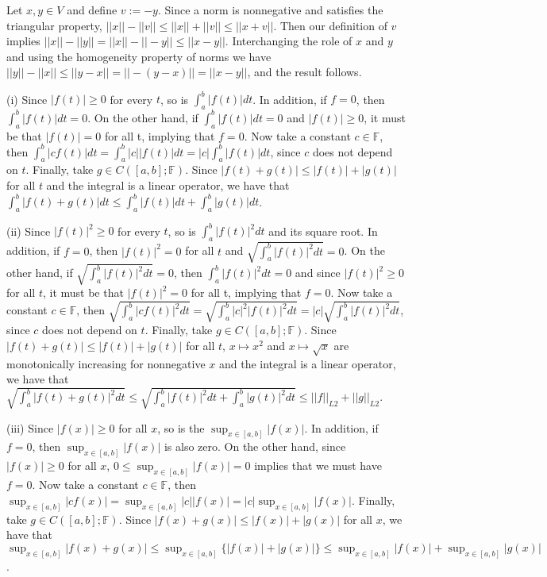\documentclass[letterpaper,12pt]{article}
\theoremstyle{definition}
\newenvironment{problem}[2][Problem]{\begin{trivlist}
\item[\hskip \labelsep {\bfseries #1}\hskip \labelsep {\bfseries #2.}]}{\end{trivlist}}
\begin{document}
\begin{problem}{23}
Let $x,y\in V$ and define $v:=-y$.
Since a norm is nonnegative and satisfies the triangular property,
$||x||-||v||\leq ||x||+||v||\leq||x+v||$.
Then our definition of $v$ implies $||x||-||y||=||x||-||-y||\leq||x-y||$.
Interchanging the role of $x$ and $y$ and using the homogeneity property of norms we have
$||y||-||x||\leq||y-x||=||-(y-x)||=||x-y||$,
and the result follows.

\end{problem} \begin{problem}{24}
(i)
Since $|f(t)|\geq 0$ for every $t$, so is $\int_a^b|f(t)|dt$.
In addition, if $f=0$, then $\int_a^b|f(t)|dt=0$.
On the other hand, if $\int_a^b|f(t)|dt=0$ and $|f(t)|\geq 0$, it must be that
$|f(t)|=0$ for all t, implying that $f=0$.
Now take a constant $c\in\mathbb F$, then
$\int_a^b|cf(t)|dt=\int_a^b|c||f(t)|dt=|c|\int_a^b|f(t)|dt$,
since $c$ does not depend on $t$.
Finally, take $g\in C([a, b]; \mathbb F)$.
Since $|f(t)+g(t)|\leq|f(t)|+|g(t)|$ for all $t$ and the integral is a linear operator,
we have that $\int_a^b|f(t)+g(t)|dt\leq\int_a^b|f(t)|dt + \int_a^b|g(t)|dt$.

(ii)
Since $|f(t)|^2\geq 0$ for every $t$, so is $\int_a^b|f(t)|^2dt$ and its square root.
In addition, if $f=0$, then $|f(t)|^2=0$ for all $t$ and $\sqrt{\int_a^b|f(t)|^2dt}=0$.
On the other hand, if $\sqrt{\int_a^b|f(t)|^2dt}=0$,
then $\int_a^b|f(t)|^2dt=0$ and since $|f(t)|^2\geq 0$ for all $t$,
it must be that $|f(t)|^2=0$ for all t, implying that $f=0$.
Now take a constant $c\in\mathbb F$, then
$\sqrt{\int_a^b|cf(t)|^2dt}=\sqrt{\int_a^b|c|^2|f(t)|^2dt}=|c|\sqrt{\int_a^b|f(t)|^2dt}$,
since $c$ does not depend on $t$.
Finally, take $g\in C([a, b]; \mathbb F)$.
Since $|f(t)+g(t)|\leq|f(t)|+|g(t)|$ for all $t$,
$x\mapsto x^2$ and $x\mapsto\sqrt{x}$ are monotonically increasing for nonnegative $x$
and the integral is a linear operator,
we have that $\sqrt{\int_a^b|f(t)+g(t)|^2dt}\leq\sqrt{\int_a^b|f(t)|^2dt + \int_a^b|g(t)|^2dt}
\leq||f||_{L2}+||g||_{L2}$.

(iii)
Since $|f(x)|\geq 0$ for all $x$, so is the $\sup_{x\in[a, b]}|f(x)|$.
In addition, if $f=0$, then $\sup_{x\in[a, b]}|f(x)|$ is also zero.
On the other hand, since $|f(x)|\geq 0$ for all $x$, $0\leq\sup_{x\in[a, b]}|f(x)|=0$
implies that we must have $f=0$.
Now take a constant $c\in\mathbb F$, then
$\sup_{x\in[a, b]}|cf(x)|=\sup_{x\in[a, b]}|c||f(x)|=|c|\sup_{x\in[a, b]}|f(x)|$.
Finally, take $g\in C([a, b];\mathbb F)$.
Since $|f(x)+g(x)|\leq|f(x)|+|g(x)|$ for all $x$, we have that
$\sup_{x\in[a, b]}|f(x)+g(x)|\leq\sup_{x\in[a, b]}\{|f(x)|+|g(x)|\}
\leq\sup_{x\in[a, b]}|f(x)|+\sup_{x\in[a, b]}|g(x)|$.


\end{problem}
\end{document}
